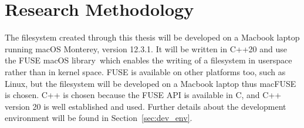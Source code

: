 
\section{Research Methodology}%

The filesystem created through this thesis will be developed on a Macbook laptop running macOS Monterey, version 12.3.1. It will be written in C++20 and use the \gls{FUSE} macOS library\,\cite{HomeMacFUSE} which enables the writing of a filesystem in userspace rather than in kernel space. \gls{FUSE} is available on other platforms too, such as Linux, but the filesystem will be developed on a Macbook laptop thus macFUSE is chosen. C++ is chosen because the \gls{FUSE} \gls{API} is available in C, and C++ version 20 is well established and used. Further details about the development environment will be found in Section~\ref{sec:dev_env}.

